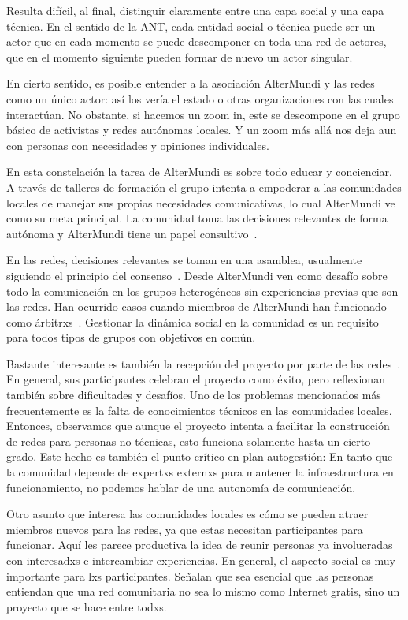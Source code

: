 Resulta difícil, al final, distinguir claramente entre una capa social y una capa técnica.
En el sentido de la ANT, cada entidad social o técnica puede ser un actor que en cada momento se puede descomponer en toda una red de actores, que en el momento siguiente pueden formar de nuevo un actor singular.

En cierto sentido, es posible entender a la asociación AlterMundi y las redes como un único actor: así los vería el estado o otras organizaciones con las cuales interactúan.
No obstante, si hacemos un zoom in, este se descompone en el grupo básico de activistas y redes autónomas locales.
Y un zoom más allá nos deja aun con personas con necesidades y opiniones individuales.

En esta constelación la tarea de AlterMundi es sobre todo educar y concienciar.
A través de talleres de formación el grupo intenta a empoderar a las comunidades locales de manejar sus propias necesidades comunicativas, lo cual AlterMundi ve como su meta principal.
La comunidad toma las decisiones relevantes de forma autónoma y AlterMundi tiene un papel consultivo~\autocite{Vaseva2016a}.

En las redes, decisiones relevantes se toman en una asamblea, usualmente siguiendo el principio del consenso~\autocite{Vaseva2016a}.
Desde AlterMundi ven como desafío sobre todo la comunicación en los grupos heterogéneos sin experiencias previas que son las redes.
Han ocurrido casos cuando miembros de AlterMundi han funcionado como árbitrxs~\autocite{Vaseva2016a}.
Gestionar la dinámica social en la comunidad es un requisito para todos tipos de grupos con objetivos en común.

Bastante interesante es también la recepción del proyecto por parte de las redes~\autocite{AlterMundi2017}.
En general, sus participantes celebran el proyecto como éxito, pero reflexionan también sobre dificultades y desafíos.
Uno de los problemas mencionados más frecuentemente es la falta de conocimientos técnicos en las comunidades locales.
Entonces, observamos que aunque el proyecto intenta a facilitar la construcción de redes para personas no técnicas, esto funciona solamente hasta un cierto grado.
Este hecho es también el punto crítico en plan autogestión:
En tanto que la comunidad depende de expertxs externxs para mantener la infraestructura en funcionamiento, no podemos hablar de una autonomía de comunicación.

Otro asunto que interesa las comunidades locales es cómo se pueden atraer miembros nuevos para las redes, ya que estas necesitan participantes para funcionar.
Aquí les parece productiva la idea de reunir personas ya involucradas con interesadxs e intercambiar experiencias.
En general, el aspecto social es muy importante para lxs participantes.
Señalan que sea esencial que las personas entiendan que una red comunitaria no sea lo mismo como Internet gratis, sino un proyecto que se hace entre todxs.

